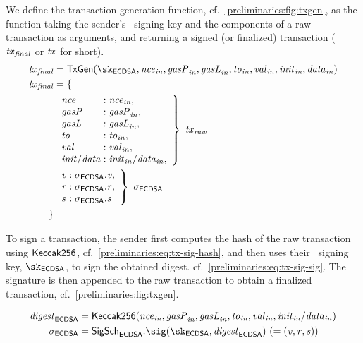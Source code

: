 We define the transaction generation function, cf.~\cref{preliminaries:fig:txgen}, as the function taking the sender's \ecdsa~signing key and the components of a raw transaction as arguments, and returning a signed (or finalized) transaction ($\mathit{\mathit{tx}_{final}}$ or $\mathit{tx}$ for short).
\begin{align*}
    \finalTx &= \txgen(\sk_{\ecdsa}, \inp{\nonce}, \inp{\gasp}, \inp{\gasl}, \inp{\tto}, \inp{\val}, \inp{\init}, \inp{\data})\\
    \finalTx &= \{ \\
                & \left.
                \begin{array}{l@{}l}
                    \nonce & {}: \inp{\nonce},\\
                    \gasp & {}: \inp{\gasp},\\
                    \gasl & {}: \inp{\gasl},\\
                    \tto & {}: \inp{\tto},\\
                    \val & {}: \inp{\val},\\
                    \init/\data & {}: \inp{\init}/\inp{\data},
                \end{array}
                \right\rbrace~\rawTx\\
                & \left.
                \begin{array}{l@{}l}
                    \sigv & {}: \sigma_\ecdsa.\sigv,\\
                    \sigr & {}: \sigma_\ecdsa.\sigr,\\
                    \sigs & {}: \sigma_\ecdsa.\sigs \\
                \end{array}
                \right\rbrace~\sigma_\ecdsa\\
                \}
\end{align*}

To sign a transaction, the sender first computes the hash of the raw transaction using $\mathsf{Keccak{256}}$, cf.~\cref{preliminaries:eq:tx-sig-hash}, and then uses their \ecdsa~signing key, $\sk_\ecdsa$, to sign the obtained digest. cf.~\cref{preliminaries:eq:tx-sig-sig}. The signature is then appended to the raw transaction to obtain a finalized transaction, cf.~\cref{preliminaries:fig:txgen}.

\begin{align}
    \digest_\ecdsa &= \keccak{256}(\inp{\nonce}, \inp{\gasp}, \inp{\gasl}, \inp{\tto}, \inp{\val}, \inp{\init}/\inp{\data}) \label{preliminaries:eq:tx-sig-hash} \\
    \sigma_{\ecdsa} &= \ecdsasigscheme.\sig(\sk_\ecdsa, \digest_\ecdsa)\ (= \smalltuple{\sigv, \sigr, \sigs}) \label{preliminaries:eq:tx-sig-sig}
\end{align}

